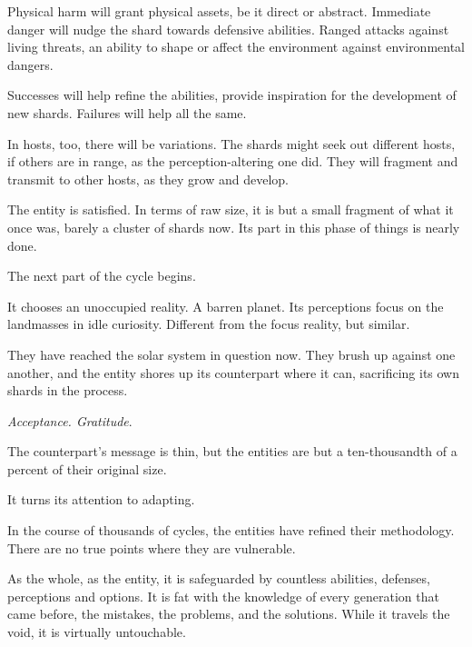 Physical harm will grant physical assets, be it direct or abstract.  Immediate danger will nudge the shard towards defensive abilities.  Ranged attacks against living threats, an ability to shape or affect the environment against environmental dangers.



Successes will help refine the abilities, provide inspiration for the development of new shards.  Failures will help all the same.



In hosts, too, there will be variations.  The shards might seek out different hosts, if others are in range, as the perception-altering one did.  They will fragment and transmit to other hosts, as they grow and develop.



The entity is satisfied.  In terms of raw size, it is but a small fragment of what it once was, barely a cluster of shards now.  Its part in this phase of things is nearly done.



The next part of the cycle begins.



It chooses an unoccupied reality.  A barren planet.  Its perceptions focus on the landmasses in idle curiosity.  Different from the focus reality, but similar.



They have reached the solar system in question now.  They brush up against one another, and the entity shores up its counterpart where it can, sacrificing its own shards in the process.



\emph{Acceptance.  Gratitude}.



The counterpart's message is thin, but the entities are but a ten-thousandth of a percent of their original size.



It turns its attention to adapting.



In the course of thousands of cycles, the entities have refined their methodology.  There are no true points where they are vulnerable.



As the whole, as the entity, it is safeguarded by countless abilities, defenses, perceptions and options.  It is fat with the knowledge of every generation that came before, the mistakes, the problems, and the solutions.  While it travels the void, it is virtually untouchable.



